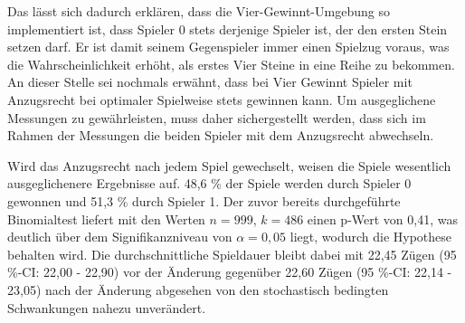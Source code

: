 Das lässt sich dadurch erklären, dass die Vier-Gewinnt-Umgebung so implementiert ist, dass Spieler 0 stets derjenige Spieler ist, der den ersten Stein setzen darf. Er ist damit seinem Gegenspieler immer einen Spielzug voraus, was die Wahrscheinlichkeit erhöht, als erstes Vier Steine in eine Reihe zu bekommen. An dieser Stelle sei nochmals erwähnt, dass bei Vier Gewinnt Spieler mit Anzugsrecht bei optimaler Spielweise stets gewinnen kann. Um ausgeglichene Messungen zu gewährleisten, muss daher sichergestellt werden, dass sich im Rahmen der Messungen die beiden Spieler mit dem Anzugsrecht abwechseln.

Wird das Anzugsrecht nach jedem Spiel gewechselt, weisen die Spiele wesentlich ausgeglichenere Ergebnisse auf. 48,6 \% der Spiele werden durch Spieler 0 gewonnen und 51,3 \% durch Spieler 1. Der zuvor bereits durchgeführte Binomialtest liefert mit den Werten $n = 999$, $k = 486$ einen p-Wert von 0,41, was deutlich über dem Signifikanzniveau von $\alpha = 0,05$ liegt, wodurch die Hypothese behalten wird. Die durchschnittliche Spieldauer bleibt dabei mit 22,45 Zügen (95 \%-CI: 22,00 - 22,90) vor der Änderung gegenüber 22,60 Zügen (95 \%-CI: 22,14 - 23,05) nach der Änderung abgesehen von den stochastisch bedingten Schwankungen nahezu unverändert.


